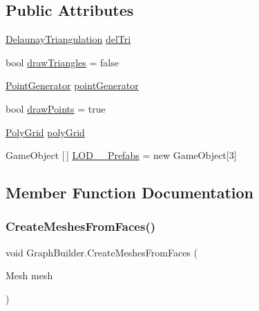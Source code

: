 \subsection*{Public Attributes}
\begin{DoxyCompactItemize}
\item 
\mbox{\hyperlink{class_delaunay_triangulation}{Delaunay\+Triangulation}} \mbox{\hyperlink{class_graph_builder_a4fbe227325c986a86af9d4b813036dcc}{del\+Tri}}
\item 
bool \mbox{\hyperlink{class_graph_builder_aacf2833ccc9ae6f68197e594ed8b3183}{draw\+Triangles}} = false
\item 
\mbox{\hyperlink{class_point_generator}{Point\+Generator}} \mbox{\hyperlink{class_graph_builder_a621748ddd5e210bde566ddf1bffa1bbe}{point\+Generator}}
\item 
bool \mbox{\hyperlink{class_graph_builder_a0acb80a89e2f7cfdaad969d6a858c832}{draw\+Points}} = true
\item 
\mbox{\hyperlink{class_poly_grid}{Poly\+Grid}} \mbox{\hyperlink{class_graph_builder_afc729c2338a301483a3f96e6106799bb}{poly\+Grid}}
\item 
Game\+Object \mbox{[}$\,$\mbox{]} \mbox{\hyperlink{class_graph_builder_a0b87acbb20c7641e19a499818a100e8a}{L\+O\+D\+\_\+\_\+\+Prefabs}} = new Game\+Object\mbox{[}3\mbox{]}
\end{DoxyCompactItemize}


\subsection{Member Function Documentation}
\mbox{\label{class_graph_builder_a5f073a99b5be732e8ea1ac4f40858d41}} 
\subsubsection{\texorpdfstring{Create\+Meshes\+From\+Faces()}{CreateMeshesFromFaces()}}
{\footnotesize\ttfamily void Graph\+Builder.\+Create\+Meshes\+From\+Faces (\begin{DoxyParamCaption}\item[{Mesh}]{mesh }\end{DoxyParamCaption})}

\mbox{\label{class_graph_builder_aa6347d6e481e9bc58f3378edd8f00cfa}} 
